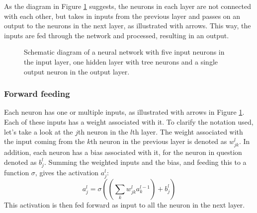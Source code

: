 As the diagram in Figure \ref{fig:NNstructure} suggests, the neurons in each layer are not connected with each other, but takes in inputs from the previous layer and passes on an output to the neurons in the next layer, as illustrated with arrows. This way, the inputs are fed through the network and processed, resulting in an output.  
\begin{figure}[htbp]
	\centering
	\caption{Schematic diagram of a neural network with five input neurons in the input layer, one hidden layer with tree neurons and a single output neuron in the output layer.}
	\label{fig:NNstructure}
\end{figure}

\subsubsection*{Forward feeding}
Each neuron has one or multiple inputs, as illustrated with arrows in Figure \ref{fig:NNstructure}. Each of these inputs has a weight associated with it. To clarify the notation used, let's take a look at the $j$th neuron in the $l$th layer. The weight associated with the input coming from the $k$th neuron in the previous layer is denoted as $w^l_{jk}$. In addition, each neuron has a bias associated with it, for the neuron in question denoted as $b^l_j$. Summing the weighted inputs and the bias, and feeding this to a function $\sigma$, gives the activation $a^l_j$: 
\begin{equation*}
	a^l_j = \sigma\left(\left(\sum_{k}w^l_{jk}a^{l-1}_k\right) + b^l_j\right)
\end{equation*}
This activation is then fed forward as input to all the neuron in the next layer. 


